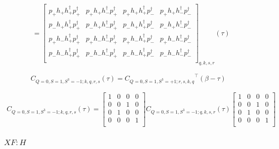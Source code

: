 \renewcommand{\cor}[4]{p_{#2}h_{#1}h^\dagger_{#4}p^\dagger_{#3}}

\begin{equation*}
  \begin{aligned}
    &=\left[ {\begin{array}{cccc}
      \cor{+}{+}{+}{+} & \cor{+}{+}{+}{-} & \cor{+}{+}{-}{+} & \cor{+}{+}{-}{-} \\
      \cor{+}{-}{+}{+} & \cor{+}{-}{+}{-} & \cor{+}{-}{-}{+} & \cor{+}{-}{-}{-} \\
      \cor{-}{+}{+}{+} & \cor{-}{+}{+}{-} & \cor{-}{+}{-}{+} & \cor{-}{+}{-}{-} \\
      \cor{-}{-}{+}{+} & \cor{-}{-}{+}{-} & \cor{-}{-}{-}{+} & \cor{-}{-}{-}{-} \\
    \end{array} } \right]_{q,k,s,r} (\tau)
  \end{aligned}
\end{equation*}

\begin{equation*}
  C_{Q=0,S=1,S^3=-1;k,q,r,s} (\tau) = {C_{Q=0,S=1,S^3=+1;r,s,k,q}}^\top (\beta-\tau)
\end{equation*}

\begin{equation*}
  \begin{aligned}
    C_{Q=0,S=1,S^3=-1;k,q,r,s} (\tau) =
    \left[ {\begin{array}{cccc}
      1 & 0 & 0 & 0 \\
      0 & 0 & 1 & 0 \\
      0 & 1 & 0 & 0 \\
      0 & 0 & 0 & 1 \\
    \end{array} } \right]
    C_{Q=0,S=1,S^3=-1;q,k,s,r}(\tau)
    \left[ {\begin{array}{cccc}
      1 & 0 & 0 & 0 \\
      0 & 0 & 1 & 0 \\
      0 & 1 & 0 & 0 \\
      0 & 0 & 0 & 1 \\
    \end{array} } \right]
  \end{aligned}
\end{equation*}

\subsubsection{\underline{$XF : H$}}


